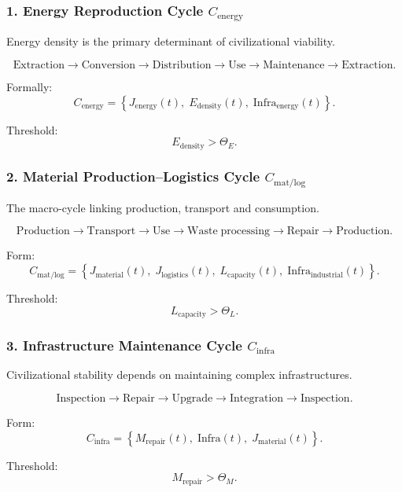 \subsubsection{1. Energy Reproduction Cycle $C_{\mathrm{energy}}$}

Energy density is the primary determinant of civilizational viability.

\[
  \mathrm{Extraction}
  \to
  \mathrm{Conversion}
  \to
  \mathrm{Distribution}
  \to
  \mathrm{Use}
  \to
  \mathrm{Maintenance}
  \to
  \mathrm{Extraction}.
\]

Formally:
\[
  C_{\mathrm{energy}} =
  \left\{
    J_{\mathrm{energy}}(t),\;
    E_{\mathrm{density}}(t),\;
    \mathrm{Infra}_{\mathrm{energy}}(t)
  \right\}.
\]

Threshold:
\[
  E_{\mathrm{density}} > \Theta_E.
\]

\subsubsection{2. Material Production–Logistics Cycle $C_{\mathrm{mat/log}}$}

The macro-cycle linking production, transport and consumption.

\[
  \mathrm{Production}
  \to
  \mathrm{Transport}
  \to
  \mathrm{Use}
  \to
  \mathrm{Waste\;processing}
  \to
  \mathrm{Repair}
  \to
  \mathrm{Production}.
\]

Form:
\[
 C_{\mathrm{mat/log}} =
 \left\{
   J_{\mathrm{material}}(t),\;
   J_{\mathrm{logistics}}(t),\;
   L_{\mathrm{capacity}}(t),\;
   \mathrm{Infra}_{\mathrm{industrial}}(t)
 \right\}.
\]

Threshold:
\[
  L_{\mathrm{capacity}} > \Theta_L.
\]

\subsubsection{3. Infrastructure Maintenance Cycle $C_{\mathrm{infra}}$}

Civilizational stability depends on maintaining complex infrastructures.

\[
  \mathrm{Inspection}
  \to
  \mathrm{Repair}
  \to
  \mathrm{Upgrade}
  \to
  \mathrm{Integration}
  \to
  \mathrm{Inspection}.
\]

Form:
\[
  C_{\mathrm{infra}} =
  \left\{
     M_{\mathrm{repair}}(t),\;
     \mathrm{Infra}(t),\;
     J_{\mathrm{material}}(t)
  \right\}.
\]

Threshold:
\[
  M_{\mathrm{repair}} > \Theta_M.
\]

